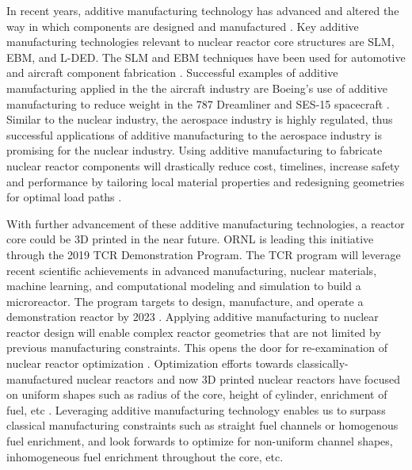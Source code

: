 In recent years, additive manufacturing technology has advanced and  
altered the way in which components are designed and manufactured 
\cite{simpson_considerations_2019}. 
Key additive manufacturing technologies relevant to nuclear reactor core 
structures are \gls{SLM}, \gls{EBM}, and \gls{L-DED}. 
The \gls{SLM} and \gls{EBM} techniques have been used for automotive and aircraft component 
fabrication \cite{murr_frontiers_2016}.  
Successful examples of additive manufacturing applied in the the aircraft industry 
are Boeing’s use of additive manufacturing to reduce weight in the 787 Dreamliner
\cite{noauthor_printed_2017} and SES-15 spacecraft \cite{noauthor_boeing_nodate}. 
Similar to the nuclear industry, the aerospace industry is highly regulated, thus 
successful applications of additive manufacturing to the aerospace industry 
is promising for the nuclear industry.  
Using additive manufacturing to fabricate nuclear reactor components will 
drastically reduce cost, timelines, increase safety and performance by 
tailoring local material properties and redesigning geometries for optimal load paths 
\cite{simpson_considerations_2019}. 

With further advancement of these additive manufacturing technologies, a reactor 
core could be 3D printed in the near future. 
\gls{ORNL} is leading this initiative through the 2019 \gls{TCR} Demonstration 
Program. 
The \gls{TCR} program will leverage recent scientific achievements in advanced 
manufacturing, nuclear materials, machine learning, and computational modeling 
and simulation to build a microreactor. 
The program targets to design, manufacture, and operate a demonstration reactor 
by 2023 \cite{terrani_transformational_2019}. 
Applying additive manufacturing to nuclear reactor design will enable complex 
reactor geometries that are not limited by previous manufacturing constraints. 
This opens the door for re-examination of nuclear reactor optimization 
\cite{sobes_artificial_2020}. 
Optimization efforts towards classically-manufactured nuclear reactors and now
3D printed nuclear reactors have focused on uniform shapes such as radius of the 
core, height of cylinder, enrichment of fuel, etc 
\cite{sobes_artificial_2020,sacco_two_2006,kumar_new_2015,pereira_parallel_2008}. 
Leveraging additive manufacturing technology enables us to surpass classical 
manufacturing constraints such as straight fuel channels or homogenous fuel enrichment, 
and look forwards to optimize for non-uniform channel shapes, inhomogeneous 
fuel enrichment throughout the core, etc. 

